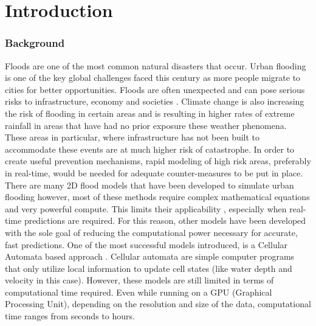 
\chapter{Introduction} %
\label{Chapter1} %

\subsection{Background}


Floods are one of the most common natural disasters that occur. Urban flooding is one of the key global challenges faced this century \cite{o2020drivers} as more people migrate to cities for better opportunities. Floods are often unexpected and can pose serious risks to infrastructure, economy and societies \cite{russo2023evaluation}. Climate change is also increasing the risk of flooding in certain areas and is resulting in higher rates of extreme rainfall in areas that have had no prior exposure these weather phenomena. These areas in particular, where infrastructure has not been built to accommodate these events are at much higher risk of catastrophe. In order to create useful prevention mechanisms, rapid modeling of high risk areas, preferably in real-time,  would be needed for adequate counter-measures to be put in place. \\

There are many 2D flood models that have been developed to simulate urban flooding however, most of these methods require complex mathematical equations and very powerful compute. This limits their applicability \cite{Ghimire}, especially when real-time predictions are required. For this reason, other models have been developed with the sole goal of reducing the computational power necessary for accurate, fast predictions. One of the most successful models introduced, is a Cellular Automata based approach \cite{guidolin2016weighted}. Cellular automata are simple computer programs that only utilize local information to update cell states (like water depth and velocity in this case). However, these models are still limited in terms of computational time required. Even while running on a GPU (Graphical Processing Unit), depending on the resolution and size of the data, computational time ranges from seconds to hours. \\

